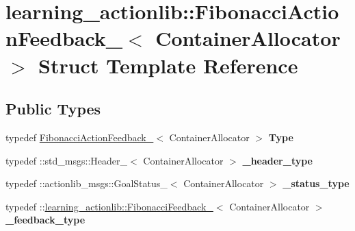 \hypertarget{structlearning__actionlib_1_1FibonacciActionFeedback__}{}\section{learning\+\_\+actionlib\+:\+:Fibonacci\+Action\+Feedback\+\_\+$<$ Container\+Allocator $>$ Struct Template Reference}
\label{structlearning__actionlib_1_1FibonacciActionFeedback__}
\subsection*{Public Types}
\begin{DoxyCompactItemize}
\item 
\mbox{\label{structlearning__actionlib_1_1FibonacciActionFeedback___aa9da518a782981d27996363966ede507}} 
typedef \hyperlink{structlearning__actionlib_1_1FibonacciActionFeedback__}{Fibonacci\+Action\+Feedback\+\_\+}$<$ Container\+Allocator $>$ {\bfseries Type}
\item 
\mbox{\label{structlearning__actionlib_1_1FibonacciActionFeedback___ab6d58be8a405d5b64502019cbc546a12}} 
typedef \+::std\+\_\+msgs\+::\+Header\+\_\+$<$ Container\+Allocator $>$ {\bfseries \+\_\+header\+\_\+type}
\item 
\mbox{\label{structlearning__actionlib_1_1FibonacciActionFeedback___af0322ddda0ed4d4c9a59de1daf066907}} 
typedef \+::actionlib\+\_\+msgs\+::\+Goal\+Status\+\_\+$<$ Container\+Allocator $>$ {\bfseries \+\_\+status\+\_\+type}
\item 
\mbox{\label{structlearning__actionlib_1_1FibonacciActionFeedback___a542d9f3195d2956a20fbcbab946d07f5}} 
typedef \+::\hyperlink{structlearning__actionlib_1_1FibonacciFeedback__}{learning\+\_\+actionlib\+::\+Fibonacci\+Feedback\+\_\+}$<$ Container\+Allocator $>$ {\bfseries \+\_\+feedback\+\_\+type}
\item 
\mbox{\label{structlearning__actionlib_1_1FibonacciActionFeedback___aea99b8e3b54d6b683e114088a854ddb0}} 

\end{DoxyCompactItemize}
